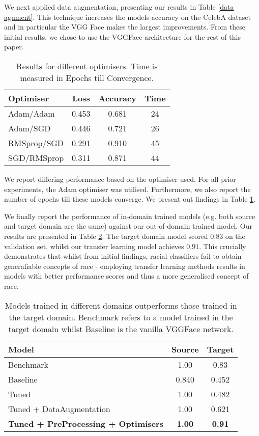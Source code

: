 \documentclass[10pt,twocolumn,letterpaper]{article}
\begin{document}
We next applied data augmentation, presenting our results in Table \ref{data agument}. This technique increases the models accuracy on the CelebA dataset and in particular the VGG Face makes the largest improvements. From these initial results, we chose to use the VGGFace architecture for the rest of this paper.

\begin{table}[h!]
\begin{center}
\begin{tabular}{|l|c|c|c|}
\hline
Optimiser&Loss &Accuracy &Time\\
\hline \hline
Adam/Adam& 0.453 & 0.681 &24\\
Adam/SGD &0.446 & 0.721&26\\
RMSprop/SGD&0.291 & 0.910&45\\
SGD/RMSprop&0.311 & 0.871&44\\
\hline
\end{tabular}
\end{center}
\caption{Results for different optimisers. Time is measured in Epochs till Convergence. \label{Table: Optimiser}}
\end{table}

We report differing performance based on the optimiser used. For all prior experiments, the Adam optimiser was utilised. Furthermore, we also report the number of epochs till these models converge. We present out findings in Table \ref{Table: Optimiser}.

We finally report the performance of in-domain trained models (e.g. both source and target domain are the same) against our out-of-domain trained model. Our results are presented in Table \ref{final}. The target domain model scored $0.83$ on the validation set, whilst our transfer learning model achieves $0.91$. This crucially demonstrates that whilst from initial findings, racial classifiers fail to obtain generaliable concepts of race - employing transfer learning methods results in models with better performance scores and thus a more generalised concept of race. 

\begin{table}[ht]
\begin{center}
\begin{tabular}{|l|c|c|}
\hline 
Model& Source & Target\\ \hline
Benchmark &1.00 &0.83  \\ \hline
Baseline &{0.840}&{0.452} \\ \hline
Tuned &{1.00}&{0.482} \\ \hline 
Tuned + DataAugmentation&1.00&0.621 \\ \hline
\textbf{Tuned + PreProcessing + Optimisers}& \textbf{1.00} & \textbf{0.91} \\ \hline
\end{tabular}
\end{center}
\caption{Models trained in different domains outperforms those trained in the target domain. Benchmark refers to a model trained in the target domain whilst Baseline is the vanilla VGGFace network. \label{final}}
\end{table}
\end{document}

